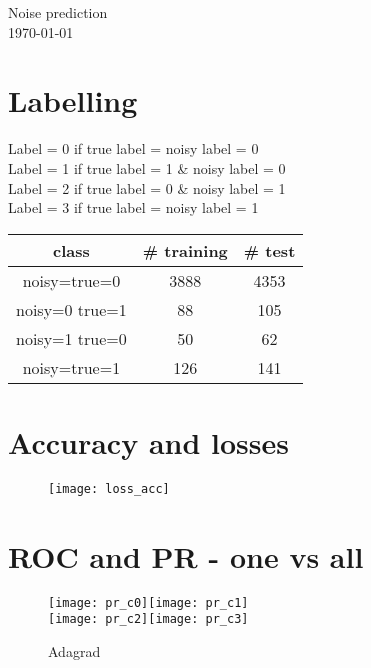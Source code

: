 \documentclass[10pt]{article}
\newcommand{\1}{\mathbbm{1}}
\newcommand{\0}{\mathbf{0}}
\begin{document}
\begin{center}
\sc\Large Noise prediction\\ {\small\today}
\end{center}

\section{Labelling}
\begin{minipage}{.4\textwidth}
Label = 0 if true label = noisy label = 0\\
Label = 1 if true label = 1 \& noisy label = 0\\
Label = 2 if true label = 0 \& noisy label = 1\\
Label = 3 if true label = noisy label = 1\\
\end{minipage}
\begin{minipage}{.6\textwidth}
\begin{center}
\begin{tabular}{|c|c|c|}
\hline
class & \# training & \# test \\
\hline
noisy=true=0 & 3888 & 4353\\
noisy=0 true=1 & 88 & 105\\
noisy=1 true=0 & 50 & 62\\
noisy=true=1 & 126  & 141\\
\hline
\end{tabular}
\end{center}
\end{minipage}
\section{Accuracy and losses}
\begin{figure}[H]
    \centering
    \texttt{[image: loss\_acc]}
    \caption{}
\end{figure}

\section{ROC and PR - one vs all}
\begin{figure}[H]
    \centering
\end{figure}
\begin{figure}[H]
    \centering
    \texttt{[image: pr\_c0]}\texttt{[image: pr\_c1]}\\
    \texttt{[image: pr\_c2]}\texttt{[image: pr\_c3]}
    \caption{Adagrad}
\end{figure}
\end{document}
